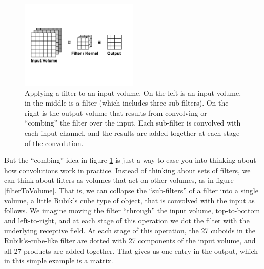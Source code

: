 \begin{figure}
\centering
\includegraphics[width=0.5\textwidth]{images/filterComb.png}
\caption[Soraya Boza.]{Applying a filter to an input volume. On the left is an input volume, in the middle is a filter (which includes three sub-filters). On the right is the output volume that results from convolving or ``combing'' the filter over the input. Each sub-filter is convolved with each input channel, and the results are added together at each stage of the convolution.}
\label{filterComb}
\end{figure}


But the ``combing'' idea in figure \ref{filterComb} is just a way to ease you into thinking about how convolutions work in practice. Instead of thinking about sets of filters, we can think about filters as volumes that act on other volumes, as in figure \ref{filterToVolume}. That is, we can collapse the ``sub-filters'' of a filter into a single volume, a little Rubik's cube type of object, that is convolved with the input as follows. We imagine moving the filter ``through'' the input volume, top-to-bottom and left-to-right, and at each stage of this operation we dot the filter with the underlying receptive field. At each stage of this operation, the 27 cuboids in the Rubik's-cube-like filter are dotted with 27 components of the input volume, and all 27 products are added together. That gives us one entry in the output, which in this simple example is a matrix.

